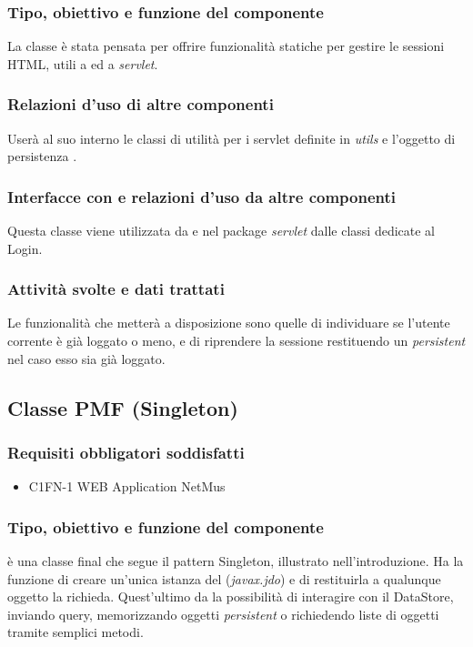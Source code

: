 \subsubsection*{Tipo, obiettivo e funzione del componente}
La classe  \`e stata pensata per offrire funzionalit\`a statiche
per gestire le sessioni HTML, utili a  ed a \emph{servlet}.

\subsubsection*{Relazioni d'uso di altre componenti}
User\`a al suo interno le classi di utilit\`a per i servlet definite in
\emph{utils} e l'oggetto di persistenza .

\subsubsection*{Interfacce con e relazioni d'uso da altre componenti}
Questa classe viene utilizzata da  e nel package
\emph{servlet} dalle classi dedicate al Login.

\subsubsection*{Attivit\`a svolte e dati trattati}
Le funzionalit\`a che metter\`a a disposizione sono quelle di individuare se
l'utente corrente \`e gi\`a loggato o meno, e di riprendere la
sessione restituendo un \emph{persistent}  nel caso esso sia
gi\`a loggato.

\subsection{Classe PMF (Singleton)}
\subsubsection*{Requisiti obbligatori soddisfatti}
\begin{itemize}
	\item C1FN-1 WEB Application NetMus
\end{itemize}
\subsubsection*{Tipo, obiettivo e funzione del componente}
 \`e una classe final che segue il pattern Singleton, illustrato
nell'introduzione. Ha la funzione di creare un'unica istanza del
 (\emph{javax.jdo}) e di restituirla a qualunque
oggetto la richieda. Quest'ultimo da la possibilit\`a di interagire con il
DataStore, inviando query, memorizzando oggetti \emph{persistent} o richiedendo liste di oggetti
tramite semplici metodi.


